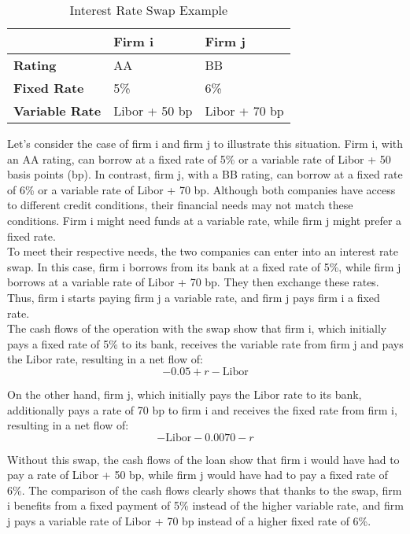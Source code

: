 \documentclass[a4paper,10pt]{article}
\begin{document}
        \begin{table}[h!]
        \centering
        \begin{tabularx}{\textwidth}{YYY}
        \toprule
         & \textbf{Firm i} & \textbf{Firm j} \\
        \midrule
        \textbf{Rating} & AA & BB \\
        \textbf{Fixed Rate} & 5\% & 6\% \\
        \textbf{Variable Rate} & Libor + 50 bp & Libor + 70 bp \\
        \bottomrule
        \end{tabularx}
        \caption{Interest Rate Swap Example}
        \end{table}
        
        \noindent Let's consider the case of firm i and firm j to illustrate this situation. Firm i, with an AA rating, can borrow at a fixed rate of 5\% or a variable rate of Libor + 50 basis points (bp). In contrast, firm j, with a BB rating, can borrow at a fixed rate of 6\% or a variable rate of Libor + 70 bp. Although both companies have access to different credit conditions, their financial needs may not match these conditions. Firm i might need funds at a variable rate, while firm j might prefer a fixed rate.\\
        
        \noindent To meet their respective needs, the two companies can enter into an interest rate swap. In this case, firm i borrows from its bank at a fixed rate of 5\%, while firm j borrows at a variable rate of Libor + 70 bp. They then exchange these rates. Thus, firm i starts paying firm j a variable rate, and firm j pays firm i a fixed rate.\\
        
        \noindent The cash flows of the operation with the swap show that firm i, which initially pays a fixed rate of 5\% to its bank, receives the variable rate from firm j and pays the Libor rate, resulting in a net flow of:
        \[-0.05 + r - \text{Libor}\]
        
        \noindent On the other hand, firm j, which initially pays the Libor rate to its bank, additionally pays a rate of 70 bp to firm i and receives the fixed rate from firm i, resulting in a net flow of:
        \[-\text{Libor} - 0.0070 - r\]
        
        \noindent Without this swap, the cash flows of the loan show that firm i would have had to pay a rate of Libor + 50 bp, while firm j would have had to pay a fixed rate of 6\%. The comparison of the cash flows clearly shows that thanks to the swap, firm i benefits from a fixed payment of 5\% instead of the higher variable rate, and firm j pays a variable rate of Libor + 70 bp instead of a higher fixed rate of 6\%.\\
        
\end{document}
